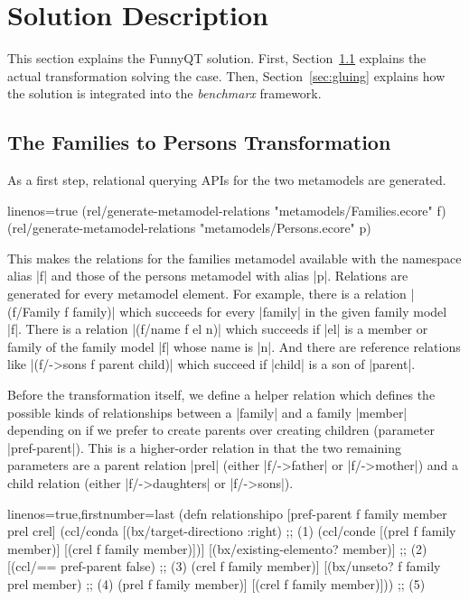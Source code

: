 \documentclass[a4paper]{article}
\newcommand{\code}{\clojureinline}
\begin{document}
\section{Solution Description}
\label{sec:solution-description}

This section explains the FunnyQT solution.  First,
Section~\ref{sec:f2p-solution} explains the actual transformation solving the
case.  Then, Section~\ref{sec:gluing} explains how the solution is integrated
into the \emph{benchmarx} framework.


\subsection{The Families to Persons Transformation}
\label{sec:f2p-solution}

As a first step, relational querying APIs for the two metamodels are generated.

\begin{clojurecode*}{linenos=true}
(rel/generate-metamodel-relations "metamodels/Families.ecore" f)
(rel/generate-metamodel-relations "metamodels/Persons.ecore" p)
\end{clojurecode*}

This makes the relations for the families metamodel available with the
namespace alias \code|f| and those of the persons metamodel with alias
\code|p|.  Relations are generated for every metamodel element.  For example,
there is a relation \code|(f/Family f family)| which succeeds for every
\code|family| in the given family model \code|f|.  There is a relation
\code|(f/name f el n)| which succeeds if \code|el| is a member or family of the
family model \code|f| whose name is \code|n|.  And there are reference
relations like \code|(f/->sons f parent child)| which succeed if \code|child|
is a son of \code|parent|.

Before the transformation itself, we define a helper relation which defines the
possible kinds of relationships between a \code|family| and a family
\code|member| depending on if we prefer to create parents over creating
children (parameter \code|pref-parent|).  This is a higher-order relation in
that the two remaining parameters are a parent relation \code|prel| (either
\code|f/->father| or \code|f/->mother|) and a child relation (either
\code|f/->daughters| or \code|f/->sons|).

\begin{clojurecode*}{linenos=true,firstnumber=last}
(defn relationshipo [pref-parent f family member prel crel]
  (ccl/conda
   [(bx/target-directiono :right)     ;; (1)
    (ccl/conde
     [(prel f family member)]
     [(crel f family member)])]
   [(bx/existing-elemento? member)]   ;; (2)
   [(ccl/== pref-parent false)        ;; (3)
    (crel f family member)]
   [(bx/unseto? f family prel member) ;; (4)
    (prel f family member)]
   [(crel f family member)]))         ;; (5)
\end{clojurecode*}
\end{document}
